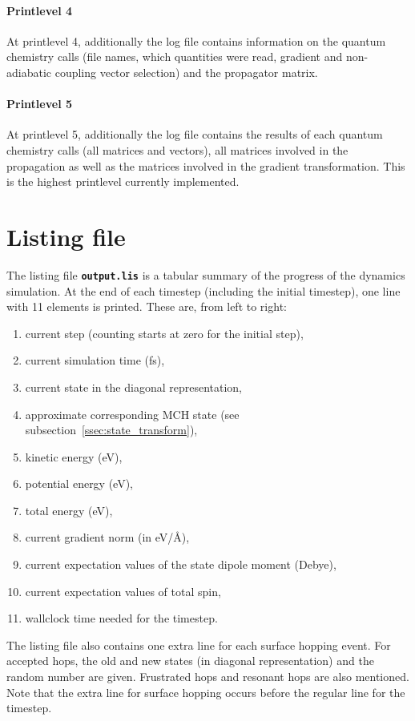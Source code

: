 \documentclass[a4paper,11pt,DIV=15,openany,twoside=false]{scrbook}
\newcommand{\ttt}[1]{\textbf{\texttt{#1}}}
\begin{document}
\paragraph{Printlevel 4}

At printlevel 4, additionally the log file contains information on the quantum chemistry calls (file names, which quantities were read, gradient and non-adiabatic coupling vector selection) and the propagator matrix.

\paragraph{Printlevel 5}

At printlevel 5, additionally the log file contains the results of each quantum chemistry calls (all matrices and vectors), all matrices involved in the propagation as well as the matrices involved in the gradient transformation. This is the highest printlevel currently implemented.

\section{Listing file}\label{sec:lisfile}

The listing file \ttt{output.lis} is a tabular summary of the progress of the dynamics simulation. At the end of each timestep (including the initial timestep), one line with 11 elements is printed. These are, from left to right:
\begin{enumerate}
  \item current step (counting starts at zero for the initial step),
  \item current simulation time (fs),
  \item current state in the diagonal representation,
  \item approximate corresponding MCH state (see subsection~\ref{ssec:state_transform}),
  \item kinetic energy (eV),
  \item potential energy (eV),
  \item total energy (eV),
  \item current gradient norm (in eV/\AA),
  \item current expectation values of the state dipole moment (Debye),
  \item current expectation values of total spin,
  \item wallclock time needed for the timestep.
\end{enumerate}
The listing file also contains one extra line for each surface hopping event. For accepted hops, the old and new states (in diagonal representation) and the random number are given. Frustrated hops and resonant hops are also mentioned. Note that the extra line for surface hopping occurs before the regular line for the timestep. 
\end{document}
